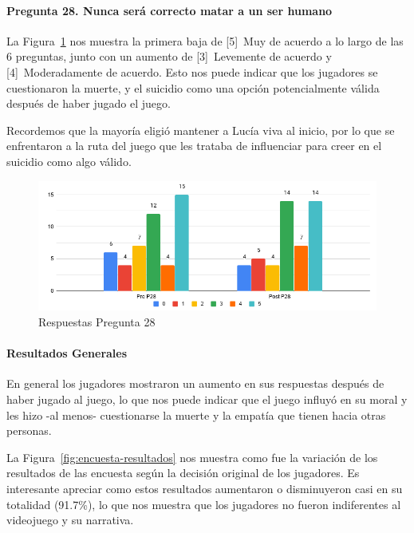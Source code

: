 \paragraph{Pregunta 28. Nunca será correcto matar a un ser humano}
La Figura~\ref{fig:chart-p28} nos muestra la primera baja de [5]~Muy de acuerdo a lo largo de las 6 preguntas, junto con un aumento de [3]~Levemente de acuerdo y [4]~Moderadamente de acuerdo. Esto nos puede indicar que los jugadores se cuestionaron la muerte, y el suicidio como una opción potencialmente válida después de haber jugado el juego.

Recordemos que la mayoría eligió mantener a Lucía viva al inicio, por lo que se enfrentaron a la ruta del juego que les trataba de influenciar para creer en el suicidio como algo válido.

\begin{figure}[h]
    \centering
    \includegraphics[width=.9\textwidth]{imgs/chart-p28.png}
    \caption{Respuestas Pregunta 28}
    \label{fig:chart-p28}
\end{figure}

\paragraph{Resultados Generales}
En general los jugadores mostraron un aumento en sus respuestas después de haber jugado al juego, lo que nos puede indicar que el juego influyó en su moral y les hizo -al menos- cuestionarse la muerte y la empatía que tienen hacia otras personas.

La Figura~\ref{fig:encuesta-resultados} nos muestra como fue la variación de los resultados de las encuesta según la decisión original de los jugadores. Es interesante apreciar como estos resultados aumentaron o disminuyeron casi en su totalidad (91.7\%), lo que nos muestra que los jugadores no fueron indiferentes al videojuego y su narrativa.

